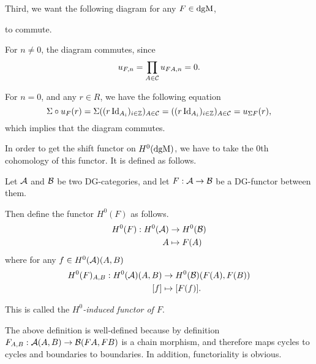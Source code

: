 \begin{remark}
    Third, we want the following diagram for any \( F \in \operatorname{dgM} \),
    \begin{center}
    \end{center}
    to commute.

    For \( n \neq 0 \), the diagram commutes, since 
    \[
        u_{F, n} = \prod_{A \in {\mathcal{C}}} u_{F A, n} = 0.
    \]

    For \( n = 0 \), and any \( r \in R \), we have the following equation
    \[
        \Sigma \circ u_F (r) = \Sigma ((r \operatorname{Id}_{A_i})_{i \in {\mathbb{Z}}})_{A \in {\mathcal{C}}} = ((r \operatorname{Id}_{A_i})_{i \in {\mathbb{Z}}})_{A \in {\mathcal{C}}} = u_{\Sigma F} (r),
    \]
    which implies that the diagram commutes.
\end{remark}

In order to get the shift functor on \( H^0(\operatorname{dgM}) \), we have to take the \( 0 \)th cohomology of this functor. It is defined as follows.

\begin{definition}
    \label{def:H^0-induced_functor}
    Let \( {\mathcal{A}} \) and \( {\mathcal{B}} \) be two DG-categories, and let \( F: {\mathcal{A}} \to {\mathcal{B}} \) be a DG-functor between them.

    Then define the functor \( H^0(F) \) as follows.
    \begin{align*}
        H^0(F): H^0({\mathcal{A}}) &\to H^0({\mathcal{B}}) \\
        A &\mapsto F(A)
    \end{align*}
    where for any \( f \in H^0({\mathcal{A}})(A, B) \)
    \begin{align*}
        H^0(F)_{A, B}: H^0({\mathcal{A}})(A, B) &\to H^0({\mathcal{B}})(F(A), F(B)) \\
        [f] &\mapsto [F(f)].
    \end{align*}

    This is called the \emph{\( H^0 \)-induced functor of \( F \)}.
\end{definition}

The above definition is well-defined because by definition \( F_{A, B}: {\mathcal{A}}(A, B) \to {\mathcal{B}}(F A, F B) \) is a chain morphism, and therefore maps cycles to cycles and boundaries to boundaries. In addition, functoriality is obvious.

